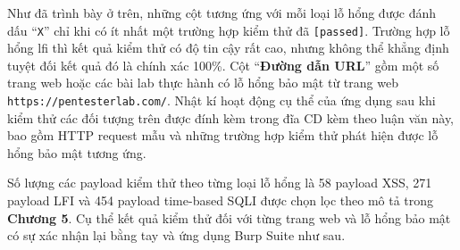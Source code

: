 Như đã trình bày ở trên, những cột tương ứng với mỗi loại lỗ hổng được đánh dấu ``\texttt{X}'' chỉ khi có ít nhất một trường hợp kiểm thử đã \texttt{[passed]}. Trường hợp lỗ hổng \acrshort{lfi} thì kết quả kiểm thử có độ tin cậy rất cao, nhưng không thể khẳng định tuyệt đối kết quả đó là chính xác 100\%. Cột ``\textbf{Đường dẫn URL}'' gồm một số trang web hoặc các bài lab thực hành có lỗ hổng bảo mật từ trang web \texttt{https://pentesterlab.com/}. Nhật kí hoạt động cụ thể của ứng dụng sau khi kiểm thử các đối tượng trên được đính kèm trong đĩa CD kèm theo luận văn này, bao gồm HTTP request mẫu và những trường hợp kiểm thử phát hiện được lỗ hổng bảo mật tương ứng. \par
Số lượng các payload kiểm thử theo từng loại lỗ hổng là 58 payload XSS, 271 payload LFI và 454 payload time-based SQLI được chọn lọc theo mô tả trong \textbf{Chương 5}. Cụ thể kết quả kiểm thử đối với từng trang web và lỗ hổng bảo mật có sự xác nhận lại bằng tay và ứng dụng Burp Suite như sau.
